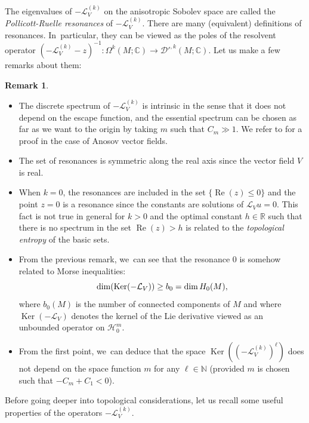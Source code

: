 \documentclass[11pt]{article}
\newcommand{\skpt}{\smallskip}
\theoremstyle{definition}
\newtheorem{remark}[definition]{Remark}
\theoremstyle{plain}
\newcommand{\C}{\mathbb{C}}
\newcommand{\D}{\mathcal{D}}
\newcommand{\Hil}{\mathcal{H}}
\newcommand{\Hsc}{\textsc{H}}
\newcommand{\Lie}{\mathcal{L}}
\newcommand{\N}{\mathbb{N}}
\newcommand{\R}{\mathbb{R}}
\DeclareMathOperator{\Ker}{Ker}
\DeclareMathOperator{\re}{Re}
\begin{document}
The eigenvalues of $-\Lie_V^{(k)}$ on the anisotropic Sobolev space are called the \textit{Pollicott-Ruelle resonances} of $-\Lie_V^{(k)}$. There are many (equivalent) definitions of resonances. In~particular, they can be viewed as the poles of the resolvent operator $(-\Lie_V^{(k)} - z)^{-1}: \Omega^k (M; \C) \to \D'^{,k} (M; \C)$. Let us make a few remarks about them:

\skpt
\begin{remark}
\begin{itemize}
\item The discrete spectrum of $-\Lie_V^{(k)}$ is intrinsic in the sense that it does not depend on the escape function, and the essential spectrum can be chosen as far as we want to the origin by taking $m$ such that $C_m \gg 1$. We refer to \cite[Th.\,1.5, p.\,134]{FS} for a proof in the case of Anosov vector fields.
\item The set of resonances is symmetric along the real axis since the vector field $V$ is real.
\item When $k = 0$, the resonances are included in the set $\{ \re (z) \leq 0 \}$ and the point $z = 0$ is a resonance since the constants are solutions of $\Lie_V u = 0$. This fact is not true in general for $k > 0$ and the optimal constant $h \in \R$ such that there is no spectrum in the set $\re (z) > h$ is related to the \textit{topological entropy} of the basic sets.
\item From the previous remark, we~can see that the resonance $0$ is somehow related to Morse inequalities:
\[
\dim (\Ker(-\Lie_V)) \geq b_0 = \dim \Hsc_0 (M),
\]
where $b_0(M)$ is the number of connected components of $M$ and where $\Ker (- \Lie_V)$ denotes the kernel of the Lie derivative viewed as an unbounded operator on $\Hil_0^m$.
\item From the first point, we~can deduce that the space $\Ker ((-\Lie_V^{(k)})^{\ell})$ does not depend on the space function $m$ for any $\ell \in \N$ (provided $m$ is chosen such that $-C_m+C_1<0$).
\end{itemize}
\end{remark}

Before going deeper into topological considerations, let us recall some useful properties of the operators $-\Lie_V^{(k)}$.
\end{document}
